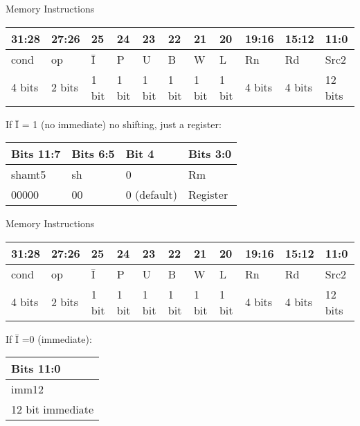 \documentclass[aspectratio=169]{beamer}
\begin{document}
\begin{frame}{Memory Instructions}
    \begin{center}
        \renewcommand{\arraystretch}{1.5}
        \begin{tabular}{|p{3.0em}|p{3.0em}|p{1.5em}|p{1.5em}|p{1.5em}|p{1.5em}|p{1.5em}|p{1.5em}|p{3.0em}|p{3.0em}|p{3.0em}|}
        \hline
        31:28 & 27:26 & 25 & 24 & 23 & 22 & 21 & 20 & 19:16 & 15:12 & 11:0\\
        \hline
        cond & op & \=I & P & U & B & W & L & Rn & Rd & Src2\\
        \hline
        4 bits & 2 bits & 1 bit & 1 bit & 1 bit & 1 bit &  1 bit & 1 bit & 4 bits & 4 bits & 12 bits\\
        \hline
        \end{tabular}
    
        \vspace{0.5cm}
    If \=I = 1 (no immediate) no shifting, just a register:
    
        \begin{tabular}{|p{6em}|p{6em}|p{6em}|p{5em}|}
            \hline
            Bits 11:7 & Bits 6:5 & Bit 4 & Bits 3:0\\
            \hline
            shamt5 & sh & 0 & Rm \\
            \hline
            00000 & 00 & 0 (default) &  Register \\
            \hline
        \end{tabular}
    \end{center}
    \end{frame}

\begin{frame}{Memory Instructions}
    \begin{center}
        \renewcommand{\arraystretch}{1.5}
        \begin{tabular}{|p{3.0em}|p{3.0em}|p{1.5em}|p{1.5em}|p{1.5em}|p{1.5em}|p{1.5em}|p{1.5em}|p{3.0em}|p{3.0em}|p{3.0em}|}
        \hline
        31:28 & 27:26 & 25 & 24 & 23 & 22 & 21 & 20 & 19:16 & 15:12 & 11:0\\
        \hline
        cond & op & \=I & P & U & B & W & L & Rn & Rd & Src2\\
        \hline
        4 bits & 2 bits & 1 bit & 1 bit & 1 bit & 1 bit &  1 bit & 1 bit & 4 bits & 4 bits & 12 bits\\
        \hline
        \end{tabular}
    
        \vspace{0.5cm}
    If \=I =0 (immediate):
    
        \begin{tabular}{|p{12em}|}
            \hline
            Bits 11:0\\
            \hline
            imm12 \\
            \hline
            12 bit immediate\\
            \hline
        \end{tabular}
    \end{center}
    \end{frame}
\end{document}
